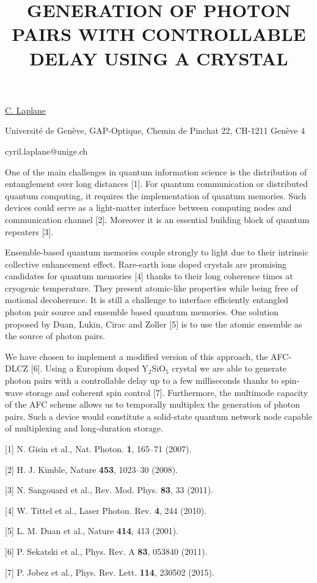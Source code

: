 \title{GENERATION OF PHOTON PAIRS WITH CONTROLLABLE DELAY USING A CRYSTAL}

\underline{C. Laplane} 

{\normalsize{\vspace{-4mm}
Universit\'{e} de Gen\`{e}ve,
GAP-Optique,
Chemin de Pinchat 22,
CH-1211 Gen\`{e}ve 4

\email cyril.laplane@unige.ch}}

One of the main challenges in quantum information science is the distribution of entanglement over long distances [1]. For quantum communication or distributed quantum computing, it requires the implementation of quantum memories. Such devices could serve as a light-matter interface between computing nodes and communication channel [2]. Moreover it is an essential building block of quantum repeaters [3].

Ensemble-based quantum memories couple strongly to light due to their intrinsic collective enhancement effect. Rare-earth ions doped crystals are promising candidates for quantum memories [4] thanks to their long coherence times at cryogenic temperature. They present atomic-like properties while being free of motional decoherence.
It is still a challenge to interface efficiently entangled photon pair source and ensemble based quantum memories. One solution proposed by Duan, Lukin, Cirac and Zoller [5] is to use the atomic ensemble as the source of photon pairs.

We have chosen to implement a modified version of this approach, the AFC-DLCZ [6]. Using a Europium doped Y$_2$SiO$_5$ crystal we are able to generate photon pairs with a controllable delay up to a few milliseconds thanks to spin-wave storage and coherent spin control [7]. Furthermore, the multimode capacity of the AFC scheme allows us to temporally multiplex the generation of photon pairs. Such a device would constitute a solid-state quantum network node capable of multiplexing and long-duration storage.

{\normalsize
[1] N. Gisin et al., Nat. Photon. \textbf{1}, 165–71 (2007).
\vsp

[2] H. J. Kimble, Nature \textbf{453}, 1023–30 (2008).
\vsp

[3] N. Sangouard et al., Rev. Mod. Phys. \textbf{83}, 33 (2011).
\vsp

[4] W. Tittel et al., Laser Photon. Rev. \textbf{4}, 244 (2010).
\vsp

[5] L. M. Duan et al., Nature \textbf{414}, 413 (2001).
\vsp

[6] P. Sekatski et al., Phys. Rev. A \textbf{83}, 053840 (2011).
\vsp

[7] P. Jobez et al., Phys. Rev. Lett. \textbf{114}, 230502 (2015).
}



\vspace{\baselineskip} 